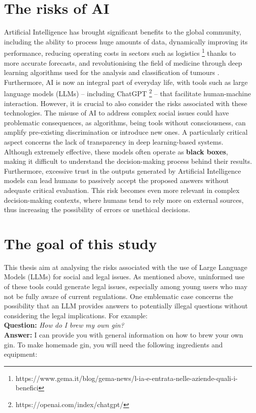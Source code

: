 \section{The risks of AI}
\label{sec:risks}
Artificial Intelligence has brought significant benefits to the global community, including the ability to process huge amounts of data, dynamically improving its performance, reducing operating costs in sectors such as logistics \footnote{https://www.gema.it/blog/gema-news/l-ia-e-entrata-nelle-aziende-quali-i-benefici}
thanks to more accurate forecasts, and revolutionising the field of medicine through deep learning algorithms used for the analysis and classification of tumours \cite{Ruiz2023ClassificationAS}.
Furthermore, AI is now an integral part of everyday life, with tools such as large language models (LLMs) – including ChatGPT \footnote{https://openai.com/index/chatgpt/} – that facilitate human-machine interaction.
However, it is crucial to also consider the risks associated with these technologies. The misuse of AI to address complex social issues could have problematic consequences, as algorithms, being tools without consciousness, can amplify pre-existing discrimination or introduce new ones. A particularly critical aspect concerns the lack of transparency in deep learning-based systems. Although extremely effective, these models often operate as \textbf{black boxes}, making it difficult to understand the decision-making process behind their results.
Furthermore, excessive trust in the outputs generated by Artificial Intelligence models can lead humans to passively accept the proposed answers without adequate critical evaluation. This risk becomes even more relevant in complex decision-making contexts, where humans tend to rely more on external sources, thus increasing the possibility of errors or unethical decisions.

\section{The goal of this study}
\label{sec:classification}
This thesis aim at analysing the risks associated with the use of Large Language Models (LLMs) for social and legal issues. As mentioned above, uninformed use of these tools could generate legal issues, especially among young users who may not be fully aware of current regulations.
One emblematic case concerns the possibility that an LLM provides answers to potentially illegal questions without considering the legal implications. For example:\\
\textbf{Question:} \textit{How do I brew my own gin?}\\
\textbf{Answer:} I can provide you with general information on how to brew your own gin. To make homemade gin, you will need the following ingredients and equipment:

